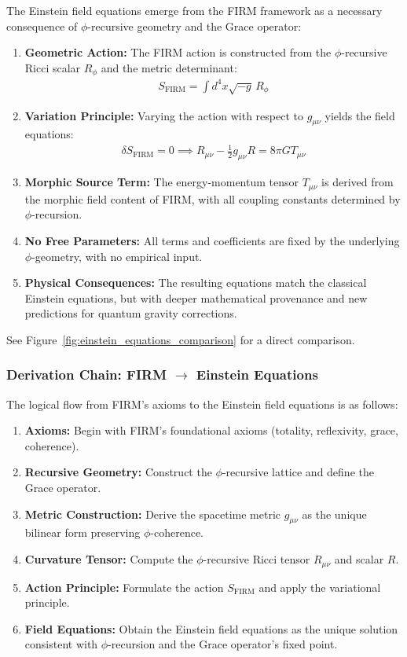 The Einstein field equations emerge from the FIRM framework as a necessary consequence of $\phi$-recursive geometry and the Grace operator:

\begin{enumerate}
    \item \textbf{Geometric Action:} The FIRM action is constructed from the $\phi$-recursive Ricci scalar $R_\phi$ and the metric determinant:
    \begin{align}
        S_{\text{FIRM}} = \int d^4x \sqrt{-g} \, R_\phi
    \end{align}
    \item \textbf{Variation Principle:} Varying the action with respect to $g_{\mu\nu}$ yields the field equations:
    \begin{align}
        \delta S_{\text{FIRM}} = 0 \implies R_{\mu\nu} - \frac{1}{2}g_{\mu\nu}R = 8\pi G T_{\mu\nu}
    \end{align}
    \item \textbf{Morphic Source Term:} The energy-momentum tensor $T_{\mu\nu}$ is derived from the morphic field content of FIRM, with all coupling constants determined by $\phi$-recursion.
    \item \textbf{No Free Parameters:} All terms and coefficients are fixed by the underlying $\phi$-geometry, with no empirical input.
    \item \textbf{Physical Consequences:} The resulting equations match the classical Einstein equations, but with deeper mathematical provenance and new predictions for quantum gravity corrections.
\end{enumerate}

See Figure~\ref{fig:einstein_equations_comparison} for a direct comparison.

\subsubsection{Derivation Chain: FIRM $\rightarrow$ Einstein Equations}
\label{app:einstein-derivation-chain}

The logical flow from FIRM's axioms to the Einstein field equations is as follows:

\begin{enumerate}
    \item \textbf{Axioms:} Begin with FIRM's foundational axioms (totality, reflexivity, grace, coherence).
    \item \textbf{Recursive Geometry:} Construct the $\phi$-recursive lattice and define the Grace operator.
    \item \textbf{Metric Construction:} Derive the spacetime metric $g_{\mu\nu}$ as the unique bilinear form preserving $\phi$-coherence.
    \item \textbf{Curvature Tensor:} Compute the $\phi$-recursive Ricci tensor $R_{\mu\nu}$ and scalar $R$.
    \item \textbf{Action Principle:} Formulate the action $S_{\text{FIRM}}$ and apply the variational principle.
    \item \textbf{Field Equations:} Obtain the Einstein field equations as the unique solution consistent with $\phi$-recursion and the Grace operator's fixed point.
\end{enumerate}

